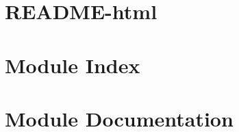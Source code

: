 \documentclass[twoside]{book}
\begin{document}
\chapter{R\-E\-A\-D\-M\-E-\/html}
\label{md_README-html}
\hypertarget{md_README-html}{}

\chapter{Module Index}

\chapter{Module Documentation}















\newpage
{}
{}
\printindex
\end{document}
